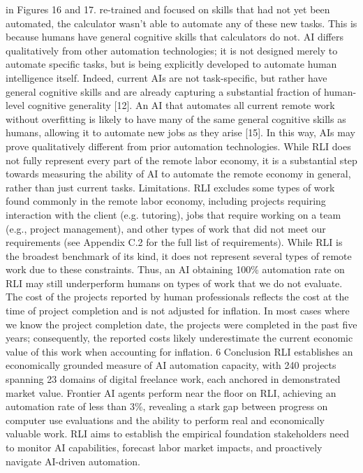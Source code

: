 in Figures 16 and 17.
re-trained and focused on skills that had not yet been automated, the calculator wasn’t able to automate
any of these new tasks. This is because humans have general cognitive skills that calculators do not.
AI differs qualitatively from other automation technologies; it is not designed merely to automate
specific tasks, but is being explicitly developed to automate human intelligence itself. Indeed, current
AIs are not task-specific, but rather have general cognitive skills and are already capturing a substantial
fraction of human-level cognitive generality [12]. An AI that automates all current remote work
without overfitting is likely to have many of the same general cognitive skills as humans, allowing
it to automate new jobs as they arise [15]. In this way, AIs may prove qualitatively different from
prior automation technologies. While RLI does not fully represent every part of the remote labor
economy, it is a substantial step towards measuring the ability of AI to automate the remote economy
in general, rather than just current tasks.
Limitations.
RLI excludes some types of work found commonly in the remote labor economy,
including projects requiring interaction with the client (e.g. tutoring), jobs that require working on a
team (e.g., project management), and other types of work that did not meet our requirements (see
Appendix C.2 for the full list of requirements). While RLI is the broadest benchmark of its kind, it
does not represent several types of remote work due to these constraints. Thus, an AI obtaining 100\%
automation rate on RLI may still underperform humans on types of work that we do not evaluate.
The cost of the projects reported by human professionals reflects the cost at the time of project
completion and is not adjusted for inflation. In most cases where we know the project completion
date, the projects were completed in the past five years; consequently, the reported costs likely
underestimate the current economic value of this work when accounting for inflation.
6
Conclusion
RLI establishes an economically grounded measure of AI automation capacity, with 240 projects
spanning 23 domains of digital freelance work, each anchored in demonstrated market value. Frontier
AI agents perform near the floor on RLI, achieving an automation rate of less than 3\%, revealing a stark
gap between progress on computer use evaluations and the ability to perform real and economically
valuable work. RLI aims to establish the empirical foundation stakeholders need to monitor AI
capabilities, forecast labor market impacts, and proactively navigate AI-driven automation.
